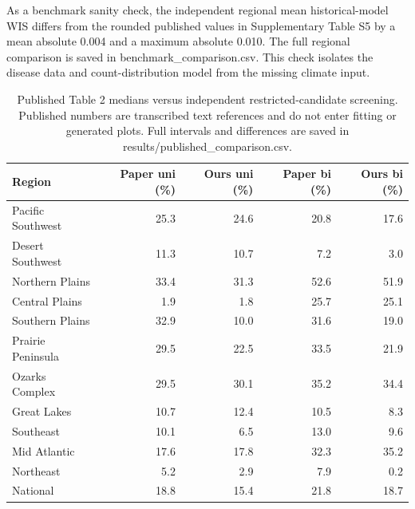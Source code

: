 \documentclass[11pt]{article}
\begin{document}
As a benchmark sanity check, the independent regional mean historical-model WIS differs from the rounded published values in Supplementary Table S5 by a mean absolute 0.004 and a maximum absolute 0.010. The full regional comparison is saved in benchmark\_comparison.csv. This check isolates the disease data and count-distribution model from the missing climate input.
\begin{table}[H]\centering\small\begin{tabular}{lrrrr}\toprule Region & Paper uni (\%) & Ours uni (\%) & Paper bi (\%) & Ours bi (\%)\\\midrule
Pacific Southwest & 25.3 & 24.6 & 20.8 & 17.6 \\
Desert Southwest & 11.3 & 10.7 & 7.2 & 3.0 \\
Northern Plains & 33.4 & 31.3 & 52.6 & 51.9 \\
Central Plains & 1.9 & 1.8 & 25.7 & 25.1 \\
Southern Plains & 32.9 & 10.0 & 31.6 & 19.0 \\
Prairie Peninsula & 29.5 & 22.5 & 33.5 & 21.9 \\
Ozarks Complex & 29.5 & 30.1 & 35.2 & 34.4 \\
Great Lakes & 10.7 & 12.4 & 10.5 & 8.3 \\
Southeast & 10.1 & 6.5 & 13.0 & 9.6 \\
Mid Atlantic & 17.6 & 17.8 & 32.3 & 35.2 \\
Northeast & 5.2 & 2.9 & 7.9 & 0.2 \\
National & 18.8 & 15.4 & 21.8 & 18.7 \\
\bottomrule\end{tabular}\caption{Published Table 2 medians versus independent restricted-candidate screening. Published numbers are transcribed text references and do not enter fitting or generated plots. Full intervals and differences are saved in results/published\_comparison.csv.}\end{table}
\end{document}
